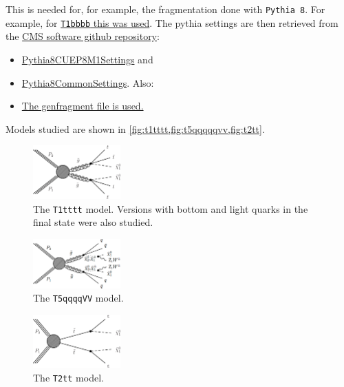 \documentclass[12pt,A4paper]{article}
\begin{document}
This is needed for, for example, the fragmentation done with \texttt{Pythia 8}.
For example, for \href{https://github.com/CMS-SUS-XPAG/GenLHEfiles/blob/593104be96b2963984328bf855ee19f39bcce5ed/GridpackWorkflow/production/models/T1bbbb/T1bbbb_fragment.py}{\texttt{T1bbbb} this was used}.
The pythia settings are then retrieved from the \href{}{CMS software github repository}:
\begin{itemize}
    \item \href{https://github.com/cms-sw/cmssw/blob/CMSSW_8_1_X/Configuration/Generator/python/Pythia8CUEP8M1Settings_cfi.py}{Pythia8CUEP8M1Settings} and
    \item \href{https://github.com/cms-sw/cmssw/blob/CMSSW_8_1_X/Configuration/Generator/python/Pythia8CommonSettings_cfi.py}{Pythia8CommonSettings}. Also:
    \item \href{https://github.com/CMS-SUS-XPAG/GenLHEfiles/blob/593104be96b2963984328bf855ee19f39bcce5ed/Run2Mechanism/genstep/genfragment.py}{The genfragment file is used.}
\end{itemize}


Models studied are shown in \autoref{fig:t1tttt,fig:t5qqqqqvv,fig:t2tt}.
\begin{figure}[]
    \centering
    \includegraphics[width=0.3\textwidth]{img/CMS-PAS-SUS-16-014_Figure_001-a.png}
    \caption{The \texttt{T1tttt} model. Versions with bottom and light quarks in the final state were also studied.}
    \label{fig:t1tttt}
\end{figure}
\begin{figure}[]
    \centering
    \includegraphics[width=0.3\textwidth]{img/CMS-PAS-SUS-16-014_Figure_001-b.png}
    \caption{The \texttt{T5qqqqVV} model.}
    \label{fig:t5qqqqvv}
\end{figure}
\begin{figure}[]
    \centering
    \includegraphics[width=0.3\textwidth]{img/CMS-PAS-SUS-16-014_Figure_001-c.png}
    \caption{The \texttt{T2tt} model.}
    \label{fig:t2tt}
\end{figure}
\end{document}

